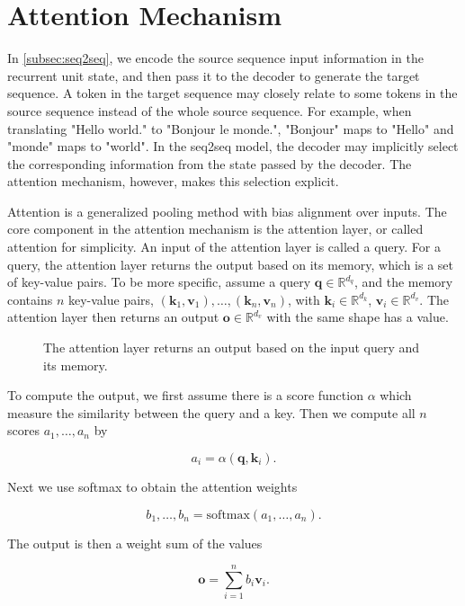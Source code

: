 \section{Attention Mechanism}\label{sec:attention}

In \cref{subsec:seq2seq}, we encode the source sequence input information in the recurrent unit state, and then pass it to the decoder to generate the target sequence. A token in the target sequence may closely relate to some tokens in the source sequence instead of the whole source sequence. For example, when translating "Hello world." to "Bonjour le monde.", "Bonjour" maps to "Hello" and "monde" maps to "world". In the seq2seq model, the decoder may implicitly select the corresponding information from the state passed by the decoder. The attention mechanism, however, makes this selection explicit.

Attention is a generalized pooling method with bias alignment over inputs. The core component in the attention mechanism is the attention layer, or called attention for simplicity. An input of the attention layer is called a query. For a query, the attention layer returns the output based on its memory, which is a set of key-value pairs. To be more specific, assume a query $\mathbf{q}\in\mathbb R^{d_q}$, and the memory contains $n$ key-value pairs, $(\mathbf{k}_1, \mathbf{v}_1), \ldots, (\mathbf{k}_n, \mathbf{v}_n)$, with $\mathbf{k}_i\in\mathbb R^{d_k}$, $\mathbf{v}_i\in\mathbb R^{d_v}$. The attention layer then returns an output $\mathbf o\in\mathbb R^{d_v}$ with the same shape has a value.

\begin{figure}[hpt]
	\centering
	
	\caption{The attention layer returns an output based on the input query and its memory.}
	\label{fig:attention}
\end{figure}

To compute the output, we first assume there is a score function $\alpha$ which measure the similarity between the query and a key. Then we compute all $n$ scores $a_1, \ldots, a_n$ by

$$a_i = \alpha(\mathbf q, \mathbf k_i).$$

Next we use softmax to obtain the attention weights

$$b_1, \ldots, b_n = \textrm{softmax}(a_1, \ldots, a_n).$$

The output is then a weight sum of the values

$$\mathbf o = \sum_{i=1}^n b_i \mathbf v_i.$$

